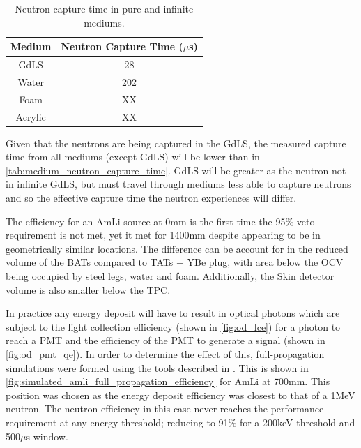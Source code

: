 \begin{table}
\centering
\begin{tabular}{c|c}
    Medium  & Neutron Capture Time ($\mu$s)  \\ \hline
    GdLS    & 28 \cite{ucsb_gdls_dicebox_simulations_ref}  \\
    Water   & 202 \cite{snoplus_neutron_capture_time_on_water_ref}  \\
    Foam    & XX   \\
    Acrylic & XX  
\end{tabular}
\caption{Neutron capture time in pure and infinite mediums.}
\label{tab:medium_neutron_capture_time}
\end{table}

Given that the neutrons are being captured in the GdLS, the measured capture time from all mediums (except GdLS) will be lower than in \autoref{tab:medium_neutron_capture_time}. 
GdLS will be greater as the neutron not in infinite GdLS, but must travel through mediums less able to capture neutrons and so the effective capture time the neutron experiences will differ.

\par
The efficiency for an AmLi source at 0mm is the first time the 95\% veto requirement is not met, yet it met for 1400mm despite appearing to be in geometrically similar locations.
The difference can be account for in the reduced volume of the BATs compared to TATs + YBe plug, with area below the OCV being occupied by steel legs, water and foam.
Additionally, the Skin detector volume is also smaller below the TPC.






\par
In practice any energy deposit will have to result in optical photons which are subject to the light collection efficiency (shown in \autoref{fig:od_lce}) for a photon to reach a PMT and the efficiency of the PMT to generate a signal (shown in \autoref{fig:od_pmt_qe}).
In order to determine the effect of this, full-propagation simulations were formed using the tools described in \cite{lz_simulations_ref}.
This is shown in \autoref{fig:simulated_amli_full_propagation_efficiency} for AmLi at 700mm. 
This position was chosen as the energy deposit efficiency was closest to that of a 1MeV neutron.
The neutron efficiency in this case never reaches the performance requirement at any energy threshold; reducing to 91\% for a 200keV threshold and 500$\mu$s window.

